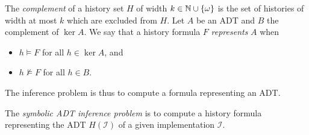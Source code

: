 The \emph{complement} of a history set $H$ of width $k \in \mathbb{N} \cup
{\{{\omega}\}}$ is the set of histories of width at most $k$ which are excluded
from $H$. Let $A$ be an ADT and $B$ the complement of $\ker A$. We say that
a history formula $F$ \emph{represents} $A$ when
\begin{itemize}

  \item $h \models F$ for all $h \in \ker A$, and

  \item $h \not\models F$ for all $h \in B$.

\end{itemize}
The inference problem is thus to compute a formula representing an ADT.

\begin{definition}

  The \emph{symbolic ADT inference problem} is to compute a history formula
  representing the ADT $H(\mathcal{I})$ of a given implementation $\mathcal{I}$.

\end{definition}
